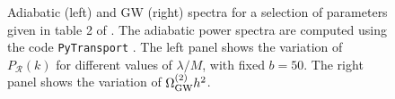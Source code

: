 \begin{enumerate}
\begin{figure}[H]
\caption{Adiabatic (left) and GW (right)  spectra for a  selection  of parameters given in table 2 of \cite{Bhattacharya:2022fze}. The adiabatic power spectra are   computed using the code \texttt{PyTransport} \cite{Mulryne:2016mzv}. The left panel shows the variation of $P_{\mathcal{R}}(k)$ for different values of $\lambda /M$, with fixed $b=50$. The right panel shows the variation of $\Omega _{\rm GW}^{(2)}h^2$. 
}
\label{fig:psgw}
\end{figure}

\end{enumerate}

\enddocument

\newpage